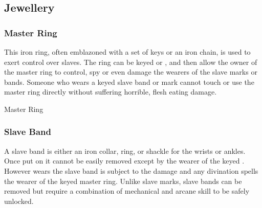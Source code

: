 \subsection{Jewellery}

\subsubsection{Master Ring}
\label{sec:Master Ring}

This iron ring, often emblazoned with a set of keys or an iron chain, is used
to exert control over slaves. The ring can be keyed 
or , and then allow the owner of the master ring to
control, spy or even damage the wearers of the slave marks or bands. Someone
who wears a keyed slave band or mark cannot touch or use the master ring
directly without suffering horrible, flesh eating damage.

\begin{35e}{Master Ring}
\end{35e}

\subsubsection{Slave Band}
\label{sec:Slave Band}

A slave band is either an iron collar, ring, or shackle for the wrists or
ankles. Once put on it cannot be easily removed except by the wearer of the
keyed . However wears the slave band is subject to
the damage and any divination spells the wearer of the keyed master ring.
Unlike slave marks, slave bands can be removed but require a combination of
mechanical and arcane skill to be safely unlocked.

